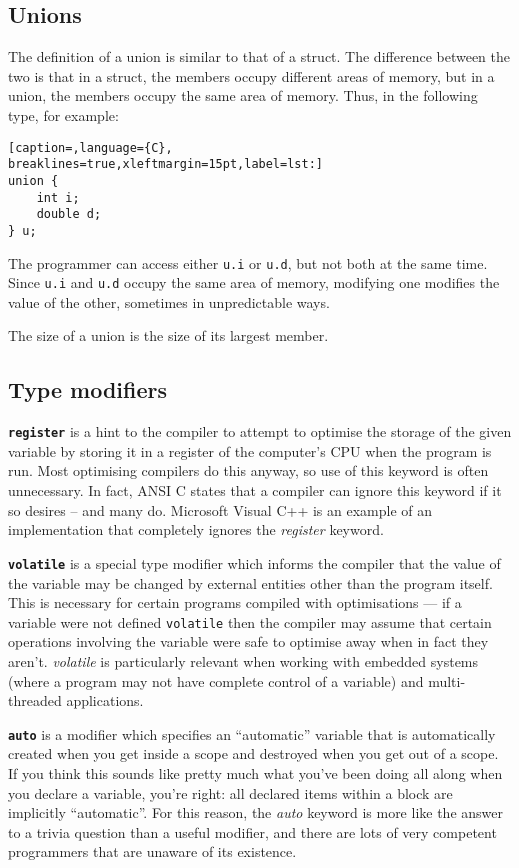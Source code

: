 \subsection{Unions}
The definition of a union is similar to that of a struct. The difference
between the two is that in a struct, the members occupy different areas of
memory, but in a union, the members occupy the same area of memory. Thus, in
the following type, for example:
\lstset{basicstyle=\scriptsize, numbers=left, captionpos=b, tabsize=4}
\begin{lstlisting}[caption=,language={C},
breaklines=true,xleftmargin=15pt,label=lst:]
union {
    int i;
    double d;
} u;
\end{lstlisting}

The programmer can access either \texttt{u.i} or \texttt{u.d}, but not both at
the same time. Since \texttt{u.i} and \texttt{u.d} occupy the same area of
memory, modifying one modifies the value of the other, sometimes in
unpredictable ways.

The size of a union is the size of its largest member.

\subsection{Type modifiers}
\textbf{\texttt{register}} is a hint to the compiler to attempt to optimise the
storage of the given variable by storing it in a register of the computer's CPU
when the program is run. Most optimising compilers do this anyway, so use of
this keyword is often unnecessary. In fact, ANSI C states that a compiler can
ignore this keyword if it so desires -- and many do. Microsoft Visual C++ is an
example of an implementation that completely ignores the \emph{register}
keyword.

\textbf{\texttt{volatile}} is a special type modifier which informs the
compiler that the value of the variable may be changed by external entities
other than the program itself. This is necessary for certain programs compiled
with optimisations --- if a variable were not defined \texttt{volatile} then
the compiler may assume that certain operations involving the variable were
safe to optimise away when in fact they aren't. \emph{volatile} is particularly
relevant when working with embedded systems (where a program may not have
complete control of a variable) and multi-threaded applications.

\textbf{\texttt{auto}} is a modifier which specifies an ``automatic'' variable
that is automatically created when you get inside a scope and destroyed when
you get out of a scope. If you think this sounds like pretty much what you've
been doing all along when you declare a variable, you're right: all declared
items within a block are implicitly ``automatic''. For this reason, the
\emph{auto} keyword is more like the answer to a trivia question than a useful
modifier, and there are lots of very competent programmers that are unaware of
its existence.

